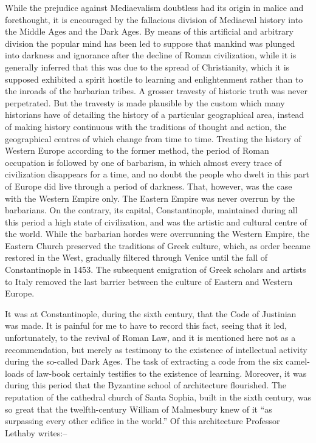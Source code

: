 \documentclass{book}
\begin{document}
While the prejudice against Mediaevalism doubtless had its origin in malice and forethought, it is encouraged by the fallacious division of Mediaeval history into the Middle Ages and the Dark Ages. By means of this artificial and arbitrary division the popular mind has been led to suppose that mankind was plunged into darkness and ignorance after the decline of Roman civilization, while it is generally inferred that this was due to the spread of Christianity, which it is supposed exhibited a spirit hostile to learning and enlightenment rather than to the inroads of the barbarian tribes. A grosser travesty of historic truth was never perpetrated. But the travesty is made plausible by the custom which many historians have of detailing the history of a particular geographical area, instead of making history continuous with the traditions of thought and action, the geographical centres of which change from time to time. Treating the history of Western Europe according to the former method, the period of Roman occupation is followed by one of barbarism, in which almost every trace of civilization disappears for a time, and no doubt the people who dwelt in this part of Europe did live through a period of darkness. That, however, was the case with the Western Empire only. The Eastern Empire was never overrun by the barbarians. On the contrary, its capital, Constantinople, maintained during all this period a high state of civilization, and was the artistic and cultural centre of the world. While the barbarian hordes were overrunning the Western Empire, the Eastern Church preserved the traditions of Greek culture, which, as order became restored in the West, gradually filtered through Venice until the fall of Constantinople in 1453. The subsequent emigration of Greek scholars and artists to Italy removed the last barrier between the culture of Eastern and Western Europe.

It was at Constantinople, during the sixth century, that the Code of Justinian was made. It is painful for me to have to record this fact, seeing that it led, unfortunately, to the revival of Roman Law, and it is mentioned here not as a recommendation, but merely as testimony to the existence of intellectual activity during the so-called Dark Ages. The task of extracting a code from the six camel-loads of law-book certainly testifies to the existence of learning. Moreover, it was during this period that the Byzantine school of architecture flourished. The reputation of the cathedral church of Santa Sophia, built in the sixth century, was so great that the twelfth-century William of Malmesbury knew of it “as surpassing every other edifice in the world.” Of this architecture Professor Lethaby writes:–
\end{document}
